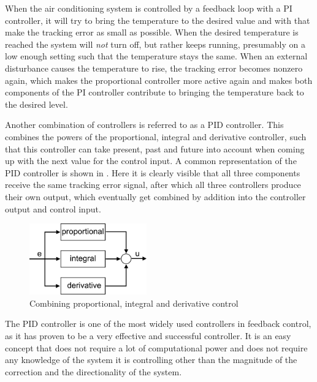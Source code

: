 When the air conditioning system is controlled by a feedback loop with a PI controller, it will try to bring the temperature to the desired value and with that make the tracking error as small as possible. When the desired temperature is reached the system will \emph{not} turn off, but rather keeps running, presumably on a low enough setting such that the temperature stays the same. When an external disturbance causes the temperature to rise, the tracking error becomes nonzero again, which makes the proportional controller more active again and makes both components of the PI controller contribute to bringing the temperature back to the desired level.

Another combination of controllers is referred to as a PID controller. This combines the powers of the proportional, integral and derivative controller, such that this controller can take present, past and future into account when coming up with the next value for the control input. A common representation of the PID controller is shown in . Here it is clearly visible that all three components receive the same tracking error signal, after which all three controllers produce their own output, which eventually get combined by addition into the controller output and control input.

\begin{figure}[H]
	\begin{center}
		\includegraphics[width=0.45\textwidth]{figures/pid.png}
	\end{center}
	\caption{Combining proportional, integral and derivative control}
	\label{fig:pid}
\end{figure}

The PID controller is one of the most widely used controllers in feedback control, as it has proven to be a very effective and successful controller. It is an easy concept that does not require a lot of computational power and does not require any knowledge of the system it is controlling other than the magnitude of the correction and the directionality of the system.

